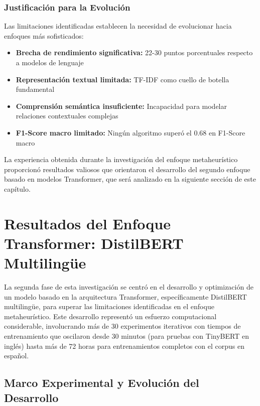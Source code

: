 \subsubsection{Justificación para la Evolución}

Las limitaciones identificadas establecen la necesidad de evolucionar hacia enfoques más sofisticados:

\begin{itemize}
    \item \textbf{Brecha de rendimiento significativa:} 22-30 puntos porcentuales respecto a modelos de lenguaje
    \item \textbf{Representación textual limitada:} TF-IDF como cuello de botella fundamental
    \item \textbf{Comprensión semántica insuficiente:} Incapacidad para modelar relaciones contextuales complejas
    \item \textbf{F1-Score macro limitado:} Ningún algoritmo superó el 0.68 en F1-Score macro
\end{itemize}

La experiencia obtenida durante la investigación del enfoque metaheurístico proporcionó resultados valiosos que orientaron el desarrollo del segundo enfoque basado en modelos Transformer, que será analizado en la siguiente sección de este capítulo.

\section{Resultados del Enfoque Transformer: DistilBERT Multilingüe}
\label{sec:resultados_distilbert}

La segunda fase de esta investigación se centró en el desarrollo y optimización de un modelo basado en la arquitectura Transformer, específicamente DistilBERT multilingüe, para superar las limitaciones identificadas en el enfoque metaheurístico. Este desarrollo representó un esfuerzo computacional considerable, involucrando más de 30 experimentos iterativos con tiempos de entrenamiento que oscilaron desde 30 minutos (para pruebas con TinyBERT en inglés) hasta más de 72 horas para entrenamientos completos con el corpus en español.

\subsection{Marco Experimental y Evolución del Desarrollo}
\label{subsec:marco_experimental_distilbert}

